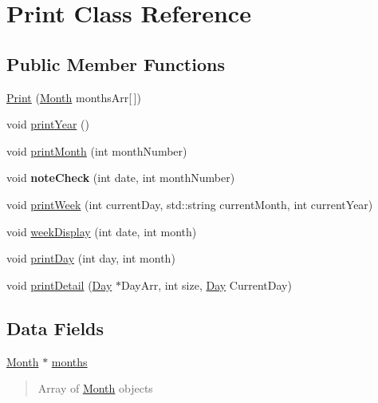 \hypertarget{classPrint}{\section{Print Class Reference}
\label{classPrint}
}
\subsection*{Public Member Functions}
\begin{DoxyCompactItemize}
\item 
\hyperlink{classPrint_a7b9e4716438a4d6003fb53d740172463}{Print} (\hyperlink{classMonth}{Month} months\-Arr\mbox{[}$\,$\mbox{]})
\item 
void \hyperlink{classPrint_ab38ff940d0abba39ec72485ba3e16259}{print\-Year} ()
\item 
void \hyperlink{classPrint_a783042d8e22a1b8a0b81bbcbc9bb03f0}{print\-Month} (int month\-Number)
\item 
\hypertarget{classPrint_ae528ed0fc9fe31222a1fcd33fe58d45b}{void {\bfseries note\-Check} (int date, int month\-Number)}\label{classPrint_ae528ed0fc9fe31222a1fcd33fe58d45b}

\item 
void \hyperlink{classPrint_a5480160313e90ae75d51255bd20a54fe}{print\-Week} (int current\-Day, std\-::string current\-Month, int current\-Year)
\item 
void \hyperlink{classPrint_a7013b300e4a36e6cd2fa8c68eab71892}{week\-Display} (int date, int month)
\item 
void \hyperlink{classPrint_adcc0b985904ceb75634e3bb0b156d033}{print\-Day} (int day, int month)
\item 
void \hyperlink{classPrint_a885ba5ae8549695d781bb03c8a3f2109}{print\-Detail} (\hyperlink{classDay}{Day} $\ast$Day\-Arr, int size, \hyperlink{classDay}{Day} Current\-Day)
\end{DoxyCompactItemize}
\subsection*{Data Fields}
\begin{DoxyCompactItemize}
\item 
\hypertarget{classPrint_a9c8bb58b547f6ffd71b735b6bb0072b1}{\hyperlink{classMonth}{Month} $\ast$ \hyperlink{classPrint_a9c8bb58b547f6ffd71b735b6bb0072b1}{months}}\label{classPrint_a9c8bb58b547f6ffd71b735b6bb0072b1}

\begin{DoxyCompactList}\small\item\em \begin{quotation}
Array of \hyperlink{classMonth}{Month} objects \end{quotation}
\end{DoxyCompactList}\end{DoxyCompactItemize}


